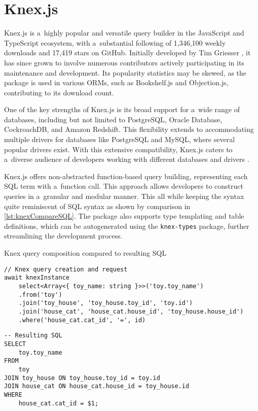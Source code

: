 \section{Knex.js}
Knex.js is a~highly popular and versatile query builder in the JavaScript and
TypeScript ecosystem, with a~substantial following of 1,346,100 weekly downloads
and 17,419 stars on GitHub. Initially developed by Tim Griesser
\cite{KnexCommits}, it has since grown to involve numerous contributors actively
participating in its maintenance and development. Its popularity statistics may
be skewed, as the package is used in various ORMs, such as Bookshelf.js and
Objection.js, contributing to its download count.

One of the key strengths of Knex.js is its broad support for a~wide range of
databases, including but not limited to PostgreSQL, Oracle Database,
CockroachDB, and Amazon Redshift. This flexibility extends to accommodating
multiple drivers for databases like PostgreSQL and MySQL, where several popular
drivers exist. With this extensive compatibility, Knex.js caters to a~diverse
audience of developers working with different databases and drivers
\cite{knexDocumentation}.

\newpage

Knex.js offers non-abstracted function-based query building, representing each
SQL term with a~function call. This approach allows developers to construct
queries in a~granular and modular manner. This all while keeping the syntax
quite reminiscent of SQL syntax as shown by comparison in
\autoref{lst:knexCompareSQL}. The package also supports type templating and
table definitions, which can be autogenerated using the \texttt{knex-types}
\cite{knexTypes} package, further streamlining the development process.

\begin{listing}
    \caption{Knex query composition compared to resulting SQL}
    \label{lst:knexCompareSQL}
\begin{verbatim}
// Knex query creation and request
await knexInstance
    select<Array<{ toy_name: string }>>('toy.toy_name')
    .from('toy')
    .join('toy_house', 'toy_house.toy_id', 'toy.id')
    .join('house_cat', 'house_cat.house_id', 'toy_house.house_id')
    .where('house_cat.cat_id', '=', id)
\end{verbatim} 

\vspace{-\medskipamount}
\vspace{-0.5\baselineskip}

\begin{verbatim}
-- Resulting SQL
SELECT
    toy.toy_name
FROM
    toy
JOIN toy_house ON toy_house.toy_id = toy.id
JOIN house_cat ON house_cat.house_id = toy_house.id
WHERE
    house_cat.cat_id = $1;
\end{verbatim}    
\end{listing}

